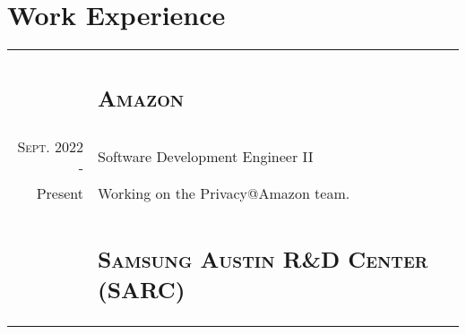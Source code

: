 \documentclass[letterpaper,10pt]{article}
\begin{document}
\section{Work Experience}
\begin{tabular}{R|B}

	                               & \subsection{\textsc{Amazon}}                                                                   \\

	\textsc{Sept.} 2022 -          & Software Development Engineer II                                                               \\
	Present\phantom{ -}            & \footnotesize Working on the Privacy@Amazon team.                                              \\
	                                                                                                            \\

	                               & \subsection{\textsc{Samsung Austin R\&D Center (SARC)}}                                        \\


\end{tabular}
\end{document}
